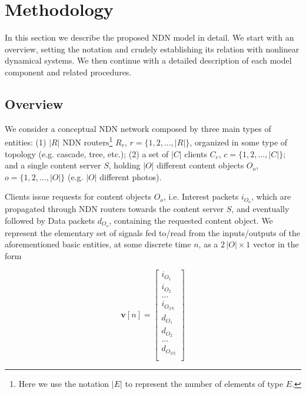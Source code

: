 \section{Methodology}
\label{sec:methodology}

In this section we describe the proposed NDN model in detail. We start with 
an overview, setting the notation and crudely establishing its relation 
with nonlinear dynamical systems. We then continue with a detailed description 
of each model component and related procedures.

\subsection{Overview}
\label{subsec:meth-overview}

We consider a conceptual NDN network composed by three main types of 
entities: (1) 
$|R|$ NDN routers\footnote{Here we use the notation $|E|$ to 
represent the number of elements of type $E$.} $R_r$, $r = \{1,2,...,|R|\}$, 
organized in some type of topology (e.g. cascade, tree, etc.); (2) a set of 
$|C|$ clients $C_c$, $c = \{1,2,...,|C|\}$; and a single 
content server $S$, holding $|O|$ different content objects $O_o$, 
$o = \{1,2,...,|O|\}$ (e.g. $|O|$ different photos).\shortvertbreak

Clients issue requests for content objects $O_o$, i.e. Interest packets $i_{O_o}$, which 
are propagated through NDN routers towards the content server $S$, and 
eventually followed by Data packets 
$d_{O_o}$, containing the requested content object. We represent the 
elementary set of signals fed to\slash read from the inputs\slash outputs of the 
aforementioned basic 
entities, at some discrete time $n$, as a $2\,|O| \times 1 $ vector in the form

\begin{equation}
    \textbf{v}[n] = \begin{bmatrix}  i_{O_1}         \\ 
                            i_{O_2}         \\ 
                             ...            \\ 
                            i_{O_{|O|}}     \\ 
                            d_{O_1}         \\ 
                            d_{O_2}         \\ 
                             ...            \\ 
                            d_{O_{|O|}}     \\ \end{bmatrix}
    \label{eq:signal}
\end{equation}\shortvertbreak

